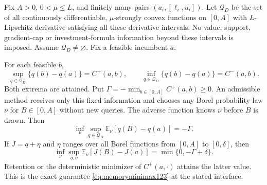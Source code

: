 Fix $A>0$, $0<\mu\le L$, and finitely many pairs
$(a_i,[\ell_i,u_i])$. Let $\mathcal Q_D$ be the set of all
continuously differentiable, $\mu$-strongly convex functions on
$[0,A]$ with $L$-Lipschitz derivative satisfying all these derivative
intervals. No value, support, gradient-cap or investment-formula
information beyond these intervals is imposed. Assume
$\mathcal Q_D\ne\varnothing$. Fix a feasible incumbent $a$.

\begin{proposition}
\label{prop:memoryminimax123}
For each feasible $b$,
\[
 \sup_{q\in\mathcal Q_D}\{q(b)-q(a)\}=C^+(a,b),\qquad
 \inf_{q\in\mathcal Q_D}\{q(b)-q(a)\}=C^-(a,b).
\]
Both extrema are attained. Put
$\Gamma=-\min_{b\in[0,A]} C^+(a,b)\ge0$.
An admissible method receives only this fixed information and
chooses any Borel probability law $\nu$ for $B\in[0,A]$ without
new queries. The adverse function knows $\nu$ before $B$ is drawn.
Then
\[
 \inf_\nu\sup_{q\in\mathcal Q_D}
      \mathbb E_\nu[q(B)-q(a)]=-\Gamma.
\]
If $J=q+\eta$ and $\eta$ ranges over all Borel functions from
$[0,A]$ to $[0,\delta]$, then
\[
 \inf_\nu\sup_{q,\eta}
      \mathbb E_\nu[J(B)-J(a)]
       =\min\{0,-\Gamma+\delta\}.
\]
Retention or the deterministic minimizer of $C^+(a,\cdot)$ attains
the latter value. This is the exact guarantee
\eqref{eq:memoryminimax123} at the stated interface.
\end{proposition}

